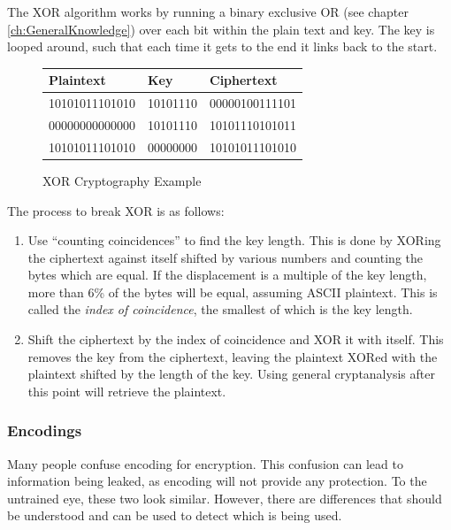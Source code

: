 				The XOR algorithm works by running a binary exclusive OR (see chapter \ref{ch:GeneralKnowledge}) 
				over each bit within the plain text and key. 
				The key is looped around, such that each time it gets to the end it links back to the start. 

				\begin{figure}[htb]
					\centering
					\begin{tabular}{| l | l | l |}
						\hline
						\textbf{Plaintext} & \textbf{Key} & \textbf{Ciphertext} \\ \hline
						10101011101010 & 10101110 & 00000100111101 \\ \hline
						00000000000000 & 10101110 & 10101110101011 \\ \hline
						10101011101010 & 00000000 & 10101011101010 \\ \hline
					\end{tabular}
					\caption{XOR Cryptography Example}
					\label{fig:XORExample}
				\end{figure}
				The process to break XOR is as follows:
				\begin{enumerate}
					\item Use ``counting coincidences'' to find the key length. 
						This is done by XORing the ciphertext against itself shifted by various numbers and counting the bytes which are equal. 
						If the displacement is a multiple of the key length, more than 6\% of the bytes will be equal, assuming ASCII plaintext. 
						This is called the \emph{index of coincidence}, the smallest of which is the key length. 
					\item Shift the ciphertext by the index of coincidence and XOR it with itself. 
						This removes the key from the ciphertext, leaving the plaintext XORed with the plaintext shifted by the length of the key. 
						Using general cryptanalysis after this point will retrieve the plaintext. 
				\end{enumerate}

			\subsubsection{Encodings}
				Many people confuse encoding for encryption. 
				This confusion can lead to information being leaked, as encoding will not provide any protection. 
				To the untrained eye, these two look similar. 
				However, there are differences that should be understood and can be used to detect which is being used. 


